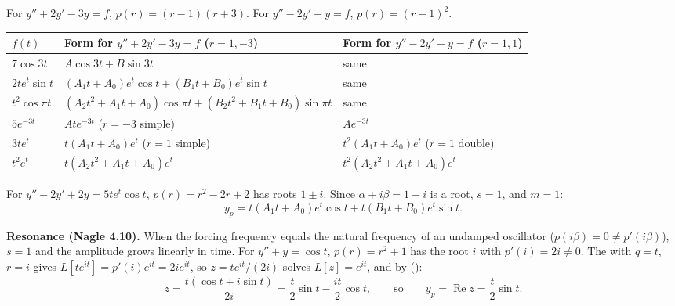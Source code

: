 \documentclass[10pt]{scrartcl}
\begin{document}
\begin{example*}
  For $y''+2y'-3y=f$, $p(r)=(r-1)(r+3)$. For $y''-2y'+y=f$, $p(r)=(r-1)^2$.
  \begin{center}
  \small
  \renewcommand{\arraystretch}{1.22}
  \begin{tabular}{@{}lll@{}}
    \toprule
    $f(t)$ & Form for $y''+2y'-3y=f$ \;\scriptsize($r=1,-3$) & Form for $y''-2y'+y=f$ \;\scriptsize($r=1,1$) \\
    \midrule
    $7\cos 3t$ & $A\cos 3t+B\sin 3t$ & same \\
    $2te^t\sin t$ & $(A_1t+A_0)e^t\cos t+(B_1t+B_0)e^t\sin t$ & same \\
    $t^2\cos\pi t$ & $(A_2t^2+A_1t+A_0)\cos\pi t+(B_2t^2+B_1t+B_0)\sin\pi t$ & same \\
    $5e^{-3t}$ & $Ate^{-3t}$ \;($r=-3$ simple) & $Ae^{-3t}$ \\
    $3te^t$ & $t(A_1t+A_0)e^t$ \;($r=1$ simple) & $t^2(A_1t+A_0)e^t$ \;($r=1$ double) \\
    $t^2e^t$ & $t(A_2t^2+A_1t+A_0)e^t$ & $t^2(A_2t^2+A_1t+A_0)e^t$ \\
    \bottomrule
  \end{tabular}
  \end{center}
\end{example*}

\begin{example*}
  For $y''-2y'+2y=5te^t\cos t$, $p(r)=r^2-2r+2$ has roots $1\pm i$. Since $\alpha+i\beta=1+i$ is a root, $s=1$, and $m=1$:
  \[
    y_p = t(A_1t+A_0)e^t\cos t + t(B_1t+B_0)e^t\sin t.
  \]
\end{example*}

\noindent\textbf{Resonance (Nagle 4.10).} When the forcing frequency equals the natural frequency of an undamped oscillator ($p(i\beta)=0\neq p'(i\beta)$), $s=1$ and the amplitude grows linearly in time. For $y''+y=\cos t$, $p(r)=r^2+1$ has the root $i$ with $p'(i)=2i\neq 0$. The  with $q=t$, $r=i$ gives $L[te^{it}]=p'(i)e^{it}=2ie^{it}$, so $z=te^{it}/(2i)$ solves $L[z]=e^{it}$, and by ():
\[
  z = \frac{t(\cos t+i\sin t)}{2i} = \frac{t}{2}\sin t - \frac{it}{2}\cos t, \qquad\text{so}\qquad y_p = \operatorname{Re}z = \frac{t}{2}\sin t.
\]
\end{document}
